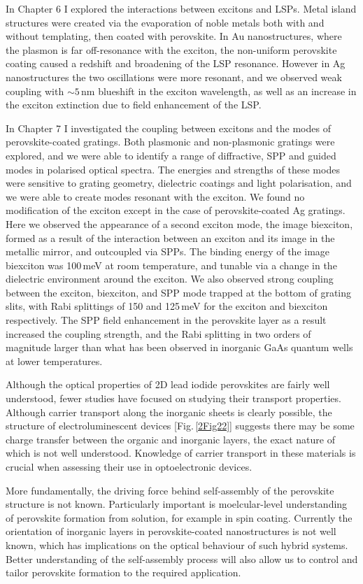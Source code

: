 In Chapter 6 I explored the interactions between excitons and LSPs. Metal island structures were created via the evaporation of noble metals both with and without templating, then coated with perovskite. In Au nanostructures, where the plasmon is far off-resonance with the exciton, the non-uniform perovskite coating caused a redshift and broadening of the LSP resonance. However in Ag nanostructures the two oscillations were more resonant, and we observed weak coupling with $\sim 5$\,nm blueshift in the exciton wavelength, as well as an increase in the exciton extinction due to field enhancement of the LSP.

In Chapter 7 I investigated the coupling between excitons and the modes of perovskite-coated gratings. Both plasmonic and non-plasmonic gratings were explored, and we were able to identify a range of diffractive, SPP and guided modes in polarised optical spectra. The energies and strengths of these modes were sensitive to grating geometry, dielectric coatings and light polarisation, and we were able to create modes resonant with the exciton. We found no modification of the exciton except in the case of perovskite-coated Ag gratings. Here we observed the appearance of a second exciton mode, the image biexciton, formed as a result of the interaction between an exciton and its image in the metallic mirror, and outcoupled via SPPs. The binding energy of the image biexciton was 100\,meV at room temperature, and tunable via a change in the dielectric environment around the exciton. We also observed strong coupling between the exciton, biexciton, and SPP mode trapped at the bottom of grating slits, with Rabi splittings of 150 and 125\,meV for the exciton and biexciton respectively. The SPP field enhancement in the perovskite layer as a result increased the coupling strength, and the Rabi splitting in two orders of magnitude larger than what has been observed in inorganic GaAs quantum wells at lower temperatures.

Although the optical properties of 2D lead iodide perovskites are fairly well understood, fewer studies have focused on studying their transport properties. Although carrier transport along the inorganic sheets is clearly possible, the structure of electroluminescent devices [Fig.\,\ref{2Fig22}] suggests there may be some charge transfer between the organic and inorganic layers, the exact nature of which is not well understood. Knowledge of carrier transport in these materials is crucial when assessing their use in optoelectronic devices.

More fundamentally, the driving force behind self-assembly of the perovskite structure is not known. Particularly important is moelcular-level understanding of perovskite formation from solution, for example in spin coating. Currently the orientation of inorganic layers in perovskite-coated nanostructures is not well known, which has implications on the optical behaviour of such hybrid systems. Better understanding of the self-assembly process will also allow us to control and tailor perovskite formation to the required application.